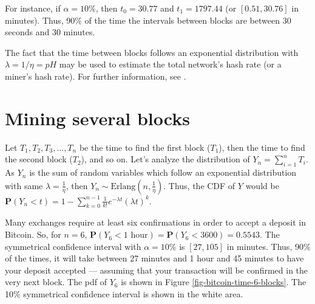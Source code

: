 For instance, if $\alpha = 10\%$, then $t_0 = 30.77$ and $t_1 = 1797.44$ (or $[0.51, 30.76]$ in minutes). Thus, 90\% of the time the intervals between blocks are between 30 seconds and 30 minutes.

The fact that the time between blocks follows an exponential distribution with $\lambda = 1/\eta = pH$ may be used to estimate the total network's hash rate (or a miner's hash rate). For further information, see \cite{ozisikestimation}.


\section{Mining several blocks}

Let $T_1, T_2, T_3, \dots, T_n$ be the time to find the first block ($T_1$), then the time to find the second block ($T_2$), and so on. Let's analyze the distribution of $Y_n = \sum_{i=1}^{n} T_i$. As $Y_n$ is the sum of random variables which follow an exponential distribution with same $\lambda = \frac{1}{\eta}$, then $Y_n \sim \text{Erlang}(n, \frac{1}{\eta})$. Thus, the CDF of $Y$ would be $\mathbf{P}(Y_n < t) = 1 - \sum_{k=0}^{n-1} \frac{1}{k!} e^{-\lambda t} (\lambda t)^k$.

Many exchanges require at least six confirmations in order to accept a deposit in Bitcoin. So, for $n=6$, $\mathbf{P}(Y_6 < 1 \text{ hour}) = \mathbf{P}(Y_6 < 3600) = 0.5543$. The symmetrical confidence interval with $\alpha=10\%$ is $[27, 105]$ in minutes. Thus, 90\% of the times, it will take between 27 minutes and 1 hour and 45 minutes to have your deposit accepted --- assuming that your transaction will be confirmed in the very next block. The pdf of $Y_6$ is shown in Figure \ref{fig-bitcoin-time-6-blocks}. The 10\% symmetrical confidence interval is shown in the white area.

